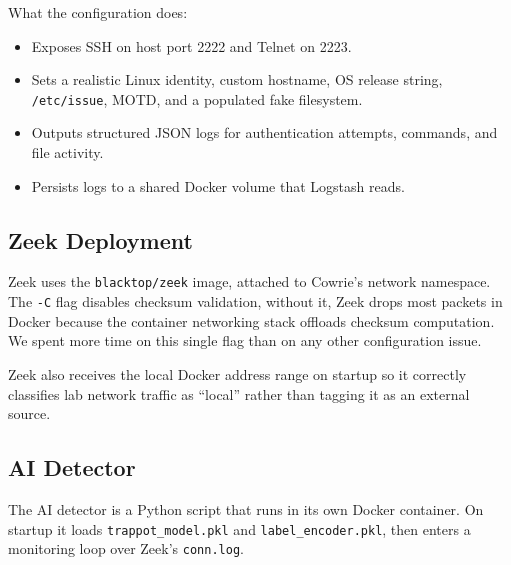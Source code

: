What the configuration does:

\begin{itemize}
\item Exposes SSH on host port 2222 and Telnet on 2223.
\item Sets a realistic Linux identity, custom hostname, OS release string, \texttt{/etc/issue}, MOTD, and a populated fake filesystem.
\item Outputs structured JSON logs for authentication attempts, commands, and file activity.
\item Persists logs to a shared Docker volume that Logstash reads.
\end{itemize}

\subsection{Zeek Deployment}
\label{subsec:zeek_deployment}

Zeek uses the \texttt{blacktop/zeek} image, attached to Cowrie's network namespace. The \texttt{-C} flag disables checksum validation, without it, Zeek drops most packets in Docker because the container networking stack offloads checksum computation. We spent more time on this single flag than on any other configuration issue.

Zeek also receives the local Docker address range on startup so it correctly classifies lab network traffic as ``local'' rather than tagging it as an external source.

\subsection{AI Detector}
\label{subsec:ai_detector}

The AI detector is a Python script that runs in its own Docker container. On startup it loads \texttt{trappot\_model.pkl} and \texttt{label\_encoder.pkl}, then enters a monitoring loop over Zeek's \texttt{conn.log}.

